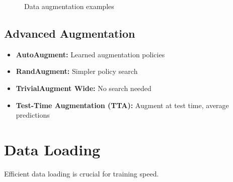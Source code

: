 \begin{figure}[h]
    \centering
    \caption{Data augmentation examples}
    \label{fig:augmentation}
\end{figure}

\subsection{Advanced Augmentation}

\begin{itemize}
    \item \textbf{AutoAugment:} Learned augmentation policies
    \item \textbf{RandAugment:} Simpler policy search
    \item \textbf{TrivialAugment Wide:} No search needed
    \item \textbf{Test-Time Augmentation (TTA):} Augment at test time, average predictions
\end{itemize}

\section{Data Loading}

Efficient data loading is crucial for training speed.

